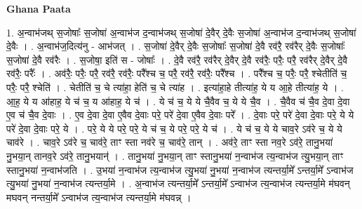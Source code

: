 \documentclass[17pt]{extarticle}
\begin{document}
\textbf{Ghana Paata } \newline

1. अ॒न्वाभ॑जथ् स॒जोषाः᳚ स॒जोषा॑ अ॒न्वाभ॑ज द॒न्वाभ॑जथ् स॒जोषा॑ दे॒वैर् दे॒वैः स॒जोषा॑ अ॒न्वाभ॑ज द॒न्वाभ॑जथ् स॒जोषा॑ दे॒वैः । . अ॒न्वाभ॑ज॒दित्य॑नु - आभ॑जत् । . स॒जोषा॑ दे॒वैर् दे॒वैः स॒जोषाः᳚ स॒जोषा॑ दे॒वै रव॑रै॒ रव॑रैर् दे॒वैः स॒जोषाः᳚ स॒जोषा॑ दे॒वै रव॑रैः । . स॒जोषा॒ इति॑ स - जोषाः᳚ । . दे॒वै रव॑रै॒ रव॑रैर् दे॒वैर् दे॒वै रव॑रैः॒ परैः॒ परै॒ रव॑रैर् दे॒वैर् दे॒वै रव॑रैः॒ परैः᳚ । . अव॑रैः॒ परैः॒ परै॒ रव॑रै॒ रव॑रैः॒ परै᳚श्च च॒ परै॒ रव॑रै॒ रव॑रैः॒ परै᳚श्च । . परै᳚श्च च॒ परैः॒ परै॒ श्चेतीति॑ च॒ परैः॒ परै॒ श्चेति॑ । . चेतीति॑ च॒ चे त्या॑हा॒ हेति॑ च॒ चे त्या॑ह । . इत्या॑हा॒हे तीत्या॑ह॒ ये य आ॒हे तीत्या॑ह॒ ये । . आ॒ह॒ ये य आ॑हाह॒ ये च॑ च॒ य आ॑हाह॒ ये च॑ । . ये च॑ च॒ ये ये चै॒वैव च॒ ये ये चै॒व । . चै॒वैव च॑ चै॒व दे॒वा दे॒वा ए॒व च॑ चै॒व दे॒वाः । . ए॒व दे॒वा दे॒वा ए॒वैव दे॒वाः परे॒ परे॑ दे॒वा ए॒वैव दे॒वाः परे᳚ । . दे॒वाः परे॒ परे॑ दे॒वा दे॒वाः परे॒ ये ये परे॑ दे॒वा दे॒वाः परे॒ ये । . परे॒ ये ये परे॒ परे॒ ये च॑ च॒ ये परे॒ परे॒ ये च॑ । . ये च॑ च॒ ये ये चाव॒रे ऽव॑रे च॒ ये ये चाव॑रे । . चाव॒रे ऽव॑रे च॒ चाव॑रे॒ ताꣳ स्ता नव॑रे च॒ चाव॑रे॒ तान् । . अव॑रे॒ ताꣳ स्ता नव॒रे ऽव॑रे॒ तानु॒भया॑ नु॒भया॒न् तानव॒रे ऽव॑रे॒ तानु॒भयान्॑ । . तानु॒भया॑ नु॒भया॒न् ताꣳ स्तानु॒भया॑ न॒न्वाभ॑ज त्य॒न्वाभ॑ज त्यु॒भया॒न् ताꣳ स्तानु॒भया॑ न॒न्वाभ॑जति । . उ॒भया॑ न॒न्वाभ॑ज त्य॒न्वाभ॑ज त्यु॒भया॑ नु॒भया॑ न॒न्वाभ॑ज त्यन्तर्या॒मे᳚ ऽन्तर्या॒मे᳚ ऽन्वाभ॑ज त्यु॒भया॑ नु॒भया॑ न॒न्वाभ॑ज त्यन्तर्या॒मे । . अ॒न्वाभ॑ज त्यन्तर्या॒मे᳚ ऽन्तर्या॒मे᳚ ऽन्वाभ॑ज त्य॒न्वाभ॑ज त्यन्तर्या॒मे म॑घवन् मघवन् नन्तर्या॒मे᳚ ऽन्वाभ॑ज त्य॒न्वाभ॑ज त्यन्तर्या॒मे म॑घवन्न् । \newline
\end{document}
